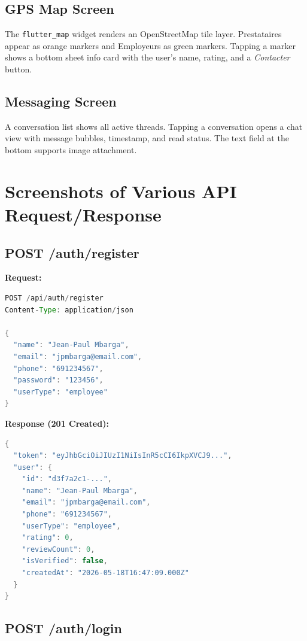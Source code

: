 \documentclass[12pt,a4paper]{report}
\begin{document}
\subsection{GPS Map Screen}
The \texttt{flutter\_map} widget renders an OpenStreetMap tile layer. Prestataires appear as orange markers and Employeurs as green markers. Tapping a marker shows a bottom sheet info card with the user's name, rating, and a \textit{Contacter} button.

\subsection{Messaging Screen}
A conversation list shows all active threads. Tapping a conversation opens a chat view with message bubbles, timestamp, and read status. The text field at the bottom supports image attachment.

\section{Screenshots of Various API Request/Response}

\subsection{POST /auth/register}

\textbf{Request:}
\begin{lstlisting}[language=Java]
POST /api/auth/register
Content-Type: application/json

{
  "name": "Jean-Paul Mbarga",
  "email": "jpmbarga@email.com",
  "phone": "691234567",
  "password": "123456",
  "userType": "employee"
}
\end{lstlisting}

\textbf{Response (201 Created):}
\begin{lstlisting}[language=Java]
{
  "token": "eyJhbGciOiJIUzI1NiIsInR5cCI6IkpXVCJ9...",
  "user": {
    "id": "d3f7a2c1-...",
    "name": "Jean-Paul Mbarga",
    "email": "jpmbarga@email.com",
    "phone": "691234567",
    "userType": "employee",
    "rating": 0,
    "reviewCount": 0,
    "isVerified": false,
    "createdAt": "2026-05-18T16:47:09.000Z"
  }
}
\end{lstlisting}

\subsection{POST /auth/login}
\end{document}
